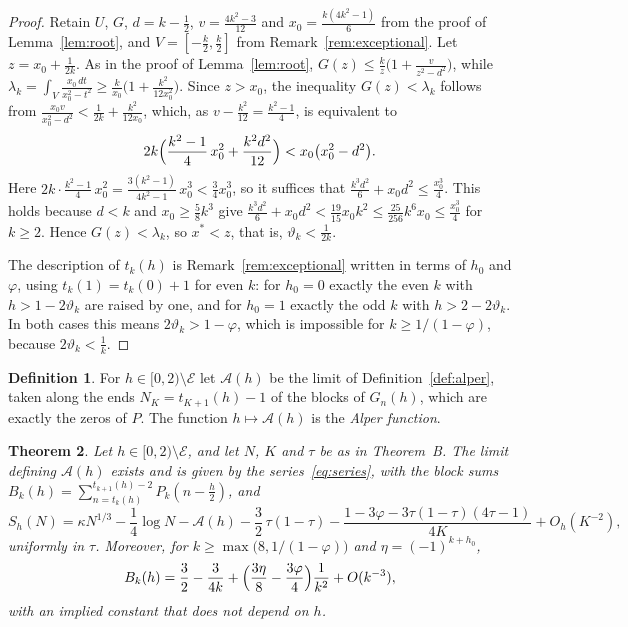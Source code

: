 \documentclass[11pt]{article}
\newtheorem{theorem}{Theorem}[section]
\theoremstyle{definition}
\newtheorem{definition}[theorem]{Definition}
\theoremstyle{remark}
\newcommand{\Alp}{\mathcal{A}}
\begin{document}
\begin{proof}
Retain $U$, $G$, $d=k-\frac12$, $v=\frac{4k^2-3}{12}$ and
$x_0=\frac{k(4k^2-1)}6$ from the proof of Lemma~\ref{lem:root}, and
$V=[-\frac k2,\frac k2]$ from Remark~\ref{rem:exceptional}. Let
$z=x_0+\frac1{2k}$. As in the proof of Lemma~\ref{lem:root},
$G(z)\le\frac kz\bigl(1+\frac v{z^2-d^2}\bigr)$, while
$\lambda_k=\int_V\frac{x_0\,dt}{x_0^2-t^2}\ge\frac k{x_0}
\bigl(1+\frac{k^2}{12x_0^2}\bigr)$. Since $z>x_0$, the inequality
$G(z)<\lambda_k$ follows from
$\frac{x_0v}{x_0^2-d^2}<\frac1{2k}+\frac{k^2}{12x_0}$, which, as
$v-\frac{k^2}{12}=\frac{k^2-1}4$, is equivalent to
\[
2k\Bigl(\frac{k^2-1}4\,x_0^2+\frac{k^2d^2}{12}\Bigr)<x_0\bigl(x_0^2-d^2\bigr).
\]
Here $2k\cdot\frac{k^2-1}4\,x_0^2=\frac{3(k^2-1)}{4k^2-1}\,x_0^3
<\frac34x_0^3$, so it suffices that
$\frac{k^3d^2}6+x_0d^2\le\frac{x_0^3}4$. This holds because $d<k$ and
$x_0\ge\frac58k^3$ give
$\frac{k^3d^2}6+x_0d^2<\frac{19}{15}x_0k^2\le\frac{25}{256}k^6x_0
\le\frac{x_0^3}4$ for $k\ge2$. Hence $G(z)<\lambda_k$, so $x^*<z$, that
is, $\vartheta_k<\frac1{2k}$.

The description of $t_k(h)$ is Remark~\ref{rem:exceptional} written in
terms of $h_0$ and $\varphi$, using $t_k(1)=t_k(0)+1$ for even $k$: for
$h_0=0$ exactly the even $k$ with $h>1-2\vartheta_k$ are raised by one,
and for $h_0=1$ exactly the odd $k$ with $h>2-2\vartheta_k$. In both
cases this means $2\vartheta_k>1-\varphi$, which is impossible for
$k\ge1/(1-\varphi)$, because $2\vartheta_k<\frac1k$.
\end{proof}

\begin{definition}\label{def:function}
For $h\in[0,2)\setminus\mathcal E$ let $\Alp(h)$ be the limit of
Definition~\ref{def:alper}, taken along the ends $N_K=t_{K+1}(h)-1$ of
the blocks of $G_n(h)$, which are exactly the zeros of $P$. The function
$h\mapsto\Alp(h)$ is the \emph{Alper function}.
\end{definition}

\begin{theorem}\label{thm:function}
Let $h\in[0,2)\setminus\mathcal E$, and let $N$, $K$ and $\tau$ be as in
Theorem~B. The limit defining $\Alp(h)$ exists and is given by the
series~\eqref{eq:series}, with the block sums
$B_k(h)=\sum_{n=t_k(h)}^{t_{k+1}(h)-2}P_k(n-\frac h2)$, and
\begin{equation}\label{eq:functionasym}
S_h(N)=\kappa N^{1/3}-\frac14\log N-\Alp(h)-\frac32\,\tau(1-\tau)
-\frac{1-3\varphi-3\tau(1-\tau)(4\tau-1)}{4K}+O_h(K^{-2}),
\end{equation}
uniformly in $\tau$. Moreover, for $k\ge\max\bigl(8,1/(1-\varphi)\bigr)$ and
$\eta=(-1)^{k+h_0}$,
\[
B_k(h)=\frac32-\frac3{4k}+\Bigl(\frac{3\eta}8-\frac{3\varphi}4\Bigr)
\frac1{k^2}+O(k^{-3}),
\]
with an implied constant that does not depend on $h$.
\end{theorem}
\end{document}
